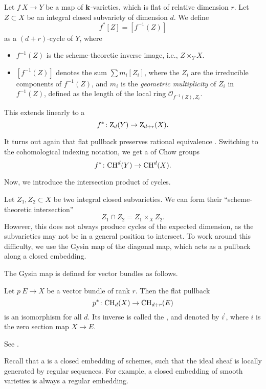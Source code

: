 \begin{definition}
    Let $f \: X \to Y$ be a map of $\bbk$-varieties, which is flat of relative dimension $r$.
    Let $Z \subset X$ be an integral closed subvariety of dimension $d$. We define
    \[ f^*[Z] = [f^{-1}(Z)] \]
    as a $(d+r)$-cycle of $Y$,
    where
    \begin{itemize}
        \item
            $f^{-1}(Z)$ is the scheme-theoretic inverse image, i.e., $Z \times_Y X$.
        \item
            $[f^{-1}(Z)]$ denotes the sum $\sum m_i [Z_i]$,
            where the $Z_i$ are the irreducible components of $f^{-1} (Z)$,
            and $m_i$ is the \emph{geometric multiplicity} of $Z_i$ in $f^{-1} (Z)$,
            defined as the length of the local ring $\mathscr{O}_{f^{-1} (Z), Z_i}$.
    \end{itemize}
    This extends linearly to a 
    \[ f^* \colon \mathrm{Z}_d (Y) \to \mathrm{Z}_{d+r} (X). \]
\end{definition}

It turns out again that flat pullback preserves rational equivalence \cite[\S1.7]{fulton}.
Switching to the cohomological indexing notation,
we get a  of Chow groups
\[ f^* \colon \mathrm{CH}^d (Y) \to \mathrm{CH}^d (X). \]

Now, we introduce the intersection product of cycles.

Let $Z_1, Z_2 \subset X$ be two integral closed subvarieties.
We can form their ``scheme-theoretic intersection''
\[ Z_1 \cap Z_2 = Z_1 \times_X Z_2. \]
However, this does not always produce cycles of the expected dimension,
as the subvarieties may not be in a general position to intersect.
To work around this difficulty, we use the Gysin map of the diagonal map, 
which acts as a pullback along a closed embedding.

The Gysin map is defined for vector bundles as follows.

\begin{theorem} \label{thm-2-gysin}
    Let $p \: E \to X$ be a vector bundle of rank $r$. Then the flat pullback
    \[ p^* \colon \mathrm{CH}_d (X) \to \mathrm{CH}_{d+r} (E) \]
    is an isomorphism for all $d$. 
    Its inverse is called the , and denoted by $i^!$,
    where $i$ is the zero section map $X \to E$.
\end{theorem}

See \cite[\S3.3]{fulton}.

Recall that a  is a
closed embedding of schemes, such that the ideal sheaf
is locally generated by regular sequences.
For example, a closed embedding of smooth varieties is always a regular embedding.

